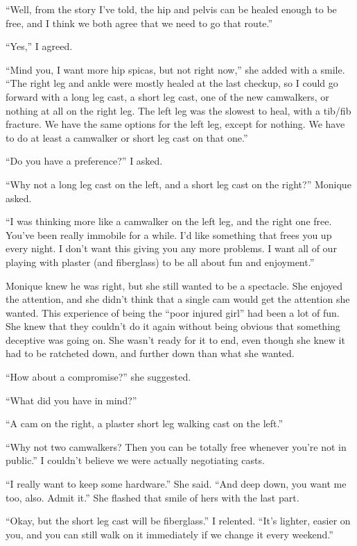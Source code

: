 ``Well, from the story I've told, the hip and pelvis can be healed enough to be free, and I
think we both agree that we need to go that route.''

``Yes,'' I agreed.

``Mind you, I want more hip spicas, but not right now,'' she added with a smile. ``The right
leg and ankle were mostly healed at the last checkup, so I could go forward with a long leg
cast, a short leg cast, one of the new camwalkers, or nothing at all on the right leg. The left
leg was the slowest to heal, with a tib/fib fracture. We have the same options for the left leg,
except for nothing. We have to do at least a camwalker or short leg cast on that one.''

``Do you have a preference?'' I asked.

``Why not a long leg cast on the left, and a short leg cast on the right?'' Monique asked.

``I was thinking more like a camwalker on the left leg, and the right one free. You've been
really immobile for a while. I'd like something that frees you up every night. I don't want this
giving you any more problems. I want all of our playing with plaster (and fiberglass) to be all
about fun and enjoyment.''

\begin{thought}
Monique knew he was right, but she still wanted to be a spectacle. She enjoyed the
attention, and she didn't think that a single cam would get the attention she wanted. This
experience of being the ``poor injured girl'' had been a lot of fun. She knew that they couldn't
do it again without being obvious that something deceptive was going on. She wasn't ready for it
to end, even though she knew it had to be ratcheted down, and further down than what she wanted.
\end{thought}

``How about a compromise?'' she suggested.

``What did you have in mind?''

``A cam on the right, a plaster short leg walking cast on the left.''

``Why not two camwalkers? Then you can be totally free whenever you're not in public.'' I
couldn't believe we were actually negotiating casts.

``I really want to keep some hardware.'' She said. ``And deep down, you want me too, also.
Admit it.'' She flashed that smile of hers with the last part.

``Okay, but the short leg cast will be fiberglass.'' I relented. ``It's lighter, easier on
you, and you can still walk on it immediately if we change it every weekend.''

